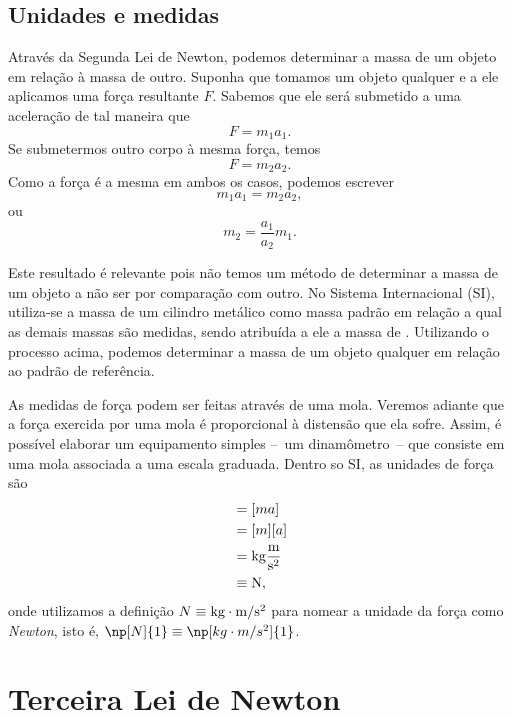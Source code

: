 \subsection{Unidades e medidas}

Através da Segunda Lei de Newton, podemos determinar a massa de um objeto em relação à massa de outro. Suponha que tomamos um objeto qualquer e a ele aplicamos uma força resultante $F$. Sabemos que ele será submetido a uma aceleração de tal maneira que
\begin{equation}
  F = m_1 a_1.
\end{equation}
%
Se submetermos outro corpo à mesma força, temos
\begin{equation}
  F = m_2 a_2.
\end{equation}
%
Como a força é a mesma em ambos os casos, podemos escrever
\begin{equation}
  m_1 a_1 = m_2 a_2,
\end{equation}
%
ou
\begin{equation}
  m_2 = \frac{a_1}{a_2}m_1.
\end{equation}

Este resultado é relevante pois não temos um método de determinar a massa de um objeto a não ser por comparação com outro. No Sistema Internacional (SI), utiliza-se a massa de um cilindro metálico como massa padrão em relação a qual as demais massas são medidas, sendo atribuída a ele a massa de . Utilizando o processo acima, podemos determinar a massa de um objeto qualquer em relação ao padrão de referência.

As medidas de força podem ser feitas através de uma mola. Veremos adiante que a força exercida por uma mola é proporcional à distensão que ela sofre. Assim, é possível elaborar um equipamento simples --~um dinamômetro~-- que consiste em uma mola associada a uma escala graduada. Dentro so SI, as unidades de força são
\begin{align}
    [F] &= [m a] \\
    &= [m] [a] \\
    &= \rm{kg} \frac{\rm{m}}{\rm{s}^2} \\
    &\equiv \rm{N},
\end{align}
%
onde utilizamos a definição $N \equiv \rm{kg}\cdot\rm{m}/\rm{s}^2$ para nomear a unidade da força como \emph{Newton}, isto é, $\np[N]{1} \equiv \np[kg\cdot m/s^2]{1}$.

\section{Terceira Lei de Newton}

